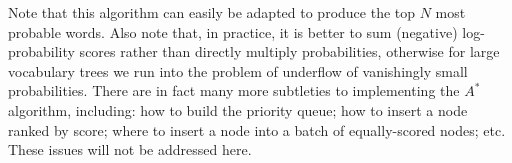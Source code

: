\documentclass[a4paper]{article}
\begin{document}
Note that this algorithm can easily be adapted to produce the top $N$ most probable words.
Also note that, in practice, it is better to sum (negative) log-probability scores rather than directly multiply probabilities,
otherwise for large vocabulary trees we run into the problem of underflow of vanishingly small probabilities.
There are in fact many more subtleties to implementing the $A^*$ algorithm, including: how to build the priority queue;
how to insert a node ranked by score;
where to insert a node into a batch of equally-scored nodes; etc. These issues will not be addressed here.

\begin{thebibliography}{9}


\end{thebibliography}
\end{document}
